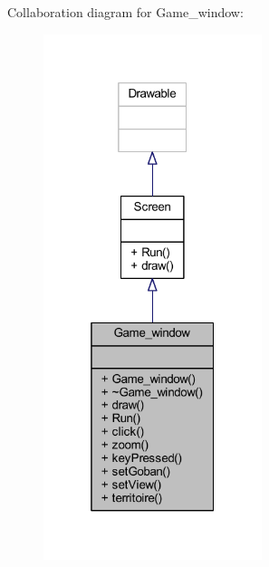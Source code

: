 Collaboration diagram for Game\+\_\+window\+:\nopagebreak
\begin{figure}[H]
\begin{center}
\leavevmode
\includegraphics[width=181pt]{class_game__window__coll__graph}
\end{center}
\end{figure}
